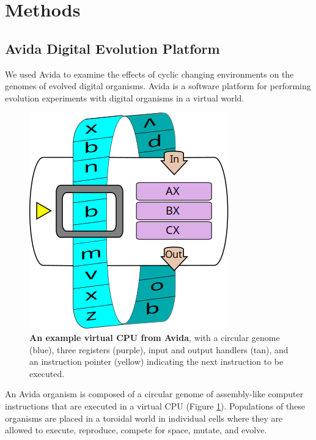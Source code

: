 \documentclass[letterpaper]{article}
\begin{document}

\section{Methods}

\subsection{Avida Digital Evolution Platform}
We used Avida \citep{lenski_evolutionary_2003} to examine the effects of cyclic changing environments on the genomes of evolved digital organisms. Avida is a software platform for performing evolution experiments with digital organisms in a virtual world.

\begin{figure}[h!]
\begin{center}
\includegraphics[width=0.5\columnwidth]{figures/squishedCPU_extra.png}
\caption{\textbf{An example virtual CPU from Avida}, with a circular genome (blue), three registers (purple), input and output handlers (tan), and an instruction pointer (yellow) indicating the next instruction to be executed.%
}\label{fig:cpu}
\end{center}
\end{figure}

An Avida organism is composed of a circular genome of assembly-like computer instructions that are executed in a virtual CPU (Figure \ref{fig:cpu}). Populations of these organisms are placed in a toroidal world in individual cells where they are allowed to execute, reproduce, compete for space, mutate, and evolve.
\end{document}
